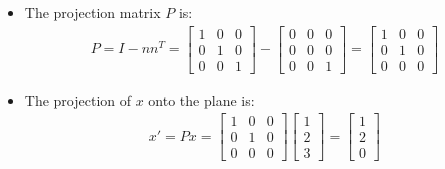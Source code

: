 \begin{frame}{}
\begin{itemize}
    \item The projection matrix $P$ is: 
    \begin{align*}
        P = I - nn^T = \begin{bmatrix}
           1&0&0\\
           0&1&0\\
           0&0&1
        \end{bmatrix} - \begin{bmatrix}
             0 &0& 0\\
             0&0& 0\\
             0&0&1
          \end{bmatrix}= \begin{bmatrix}
             1 & 0 & 0\\
             0& 1& 0 \\
             0& 0& 0
          \end{bmatrix}
    \end{align*}
    \item The projection of $x$ onto the plane is:
    \begin{align*}
        x' = Px = \begin{bmatrix}
             1 & 0 & 0\\
             0& 1& 0 \\
             0& 0& 0
          \end{bmatrix}\begin{bmatrix}
             1\\2\\3
          \end{bmatrix} = \begin{bmatrix}
             1\\2\\0
          \end{bmatrix}
    \end{align*}
\end{itemize}
\end{frame}


